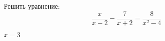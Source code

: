 \begin{ex}
	Решить уравнение:
	$$ \dfrac{x}{x-2}-\dfrac{7}{x+2}=\dfrac{8}{x^2-4} $$
	\begin{answer}
		$x=3$
	\end{answer}
\end{ex}